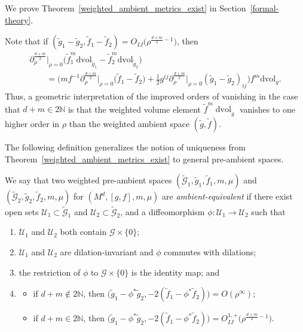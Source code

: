 \documentclass[11pt]{article}
\numberwithin{equation}{section}
\newcommand{\cg}{\widetilde{g}}
\newcommand{\cf}{\widetilde{f}}
\numberwithin{equation}{section}
\begin{document}
We prove Theorem~\ref{weighted_ambient_metrics_exist} in Section~\ref{formal-theory}.

Note that if $(\cg_1-\cg_2,\cf_1-\cf_2)=O_{IJ}\big(\rho^{\frac{d+m}{2}-1}\big)$, then
\begin{gather*}
{\partial^{\frac{d+m}{2}}_\rho}\big|_{\rho=0}\big(\widetilde{f}_1^m\mathrm{dvol}_{\widetilde{g}_1}- \widetilde{f}_2^m\mathrm{dvol}_{\widetilde{g}_2}\big)
\\ \qquad
{}= \biggl(mf^{-1}{\partial_\rho^{\frac{d+m}{2}}}\big|_{\rho=0}\big(\widetilde{f}_1-\widetilde{f}_2\big)
+\frac{1}{2}g^{ij}{\partial_\rho^{\frac{d+m}{2}}}\big|_{\rho=0} (\widetilde{g}_1-\widetilde{g}_2)_{ij}\biggr)f^m\mathrm{dvol}_{g}.
\end{gather*}
Thus, a geometric interpretation of the improved orders of vanishing in the case that $d+m\in 2\mathbb{N}$ is that the weighted volume element $\widetilde{f}^m\operatorname{dvol}_{\widetilde{g}}$ vanishes to one higher order in $\rho$ than the weighted ambient space $(\widetilde{g},\widetilde{f})$.

The following definition generalizes the notion of uniqueness from Theorem~\ref{weighted_ambient_metrics_exist} to general pre-ambient spaces.

\begin{Definition}
{\sloppy
We say that two weighted pre-ambient spaces $(\widetilde{\mathcal{G}}_{1}, \widetilde{g}_{1},\widetilde{f}_1,m,\mu)$ and $(\widetilde{\mathcal{G}}_{2}, \widetilde{g}_{2}, \widetilde{f}_2,\allowbreak m,\mu)$ for $(M^d,[g,f],m,\mu)$ are \emph{ambient-equivalent} if there exist open sets $\mathcal{U}_{1} \subset \widetilde{\mathcal{G}}_{1}$ and $\mathcal{U}_{2} \subset \widetilde{\mathcal{G}}_{2}$, and a diffeomorphism $\phi\colon \mathcal{U}_{1} \rightarrow \mathcal{U}_{2}$ such that}
\begin{enumerate}[label=$(\roman*)$]\itemsep=0pt
\item $\mathcal{U}_{1}$ and $\mathcal{U}_{2}$ both contain $\mathcal{G} \times\{0\}$;

\item $\mathcal{U}_{1}$ and $\mathcal{U}_{2}$ are dilation-invariant and $\phi$ commutes with dilations;

\item the restriction of $\phi$ to $\mathcal{G} \times\{0\}$ is the identity map; and

\item \begin{itemize}
\item[$(a)$] if $d+m\notin 2\mathbb{N}$, then $\big(\widetilde{g}_{1}-\phi^{*} \widetilde{g}_{2}, -2(\widetilde{f}_1-\phi^*\widetilde{f}_2)\big)=O(\rho^\infty)$;
\item[$(b)$] if $d+m\in 2\mathbb{N}$, then $\big(\widetilde{g}_{1}-\phi^{*} \widetilde{g}_{2}, -2(\widetilde{f}_1-\phi^*\widetilde{f}_2)\big)=O_{I J}^{1,+}\big(\rho^{\frac{d+m}{2}-1}\big)$.
\end{itemize}
\end{enumerate}
\end{Definition}
\end{document}
